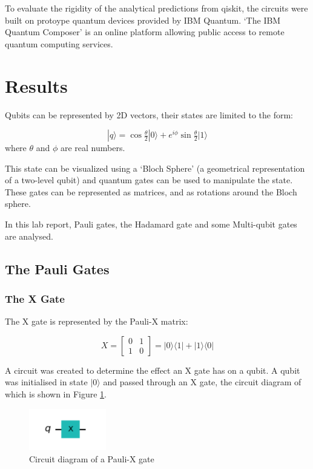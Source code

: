 To evaluate the rigidity of the analytical predictions from qiskit, the circuits were built on protoype quantum devices provided by IBM Quantum. `The IBM Quantum Composer' is an online platform allowing public access to remote quantum computing services.


\section{Results}
Qubits can be represented by 2D vectors, their states are limited to the form:

$$ |q\rangle = \cos{\tfrac{\theta}{2}}|0\rangle + e^{i\phi}\sin{\tfrac{\theta}{2}}|1\rangle $$
where $\theta$ and $\phi$ are real numbers. 

This state can be visualized using a `Bloch Sphere' (a geometrical representation of a two-level qubit) and quantum gates can be used to manipulate the state. These gates can be represented as matrices, and as rotations around the Bloch sphere.

In this lab report, Pauli gates, the Hadamard gate and some Multi-qubit gates are analysed.

\subsection{The Pauli Gates}

\subsubsection{The X Gate}
The X gate is represented by the Pauli-X matrix:

$$ X = \begin{bmatrix} 0 & 1 \\ 1 & 0 \end{bmatrix} = |0\rangle\langle1| + |1\rangle\langle0| $$

A circuit was created to determine the effect an X gate has on a qubit. A qubit was initialised in state $|0\rangle$ and passed through an X gate, the circuit diagram of which is shown in Figure \ref{fig:xGate}.

\begin{figure}[h]
    \centering
    \includegraphics[width=0.3\textwidth]{lab2/images/xGate.png}
    \caption{Circuit diagram of a Pauli-X gate} 
    \label{fig:xGate}
\end{figure}

